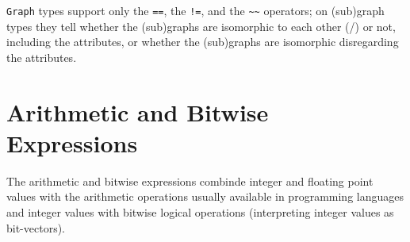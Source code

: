 \texttt{Graph} types support only the \texttt{==}, the \texttt{!=}, and the \texttt{\textasciitilde\textasciitilde} operators;
on (sub)graph types they tell whether the (sub)graphs are isomorphic to each other (/) or not, including the attributes, or whether the (sub)graphs are isomorphic disregarding the attributes.

\section{Arithmetic and Bitwise Expressions}

The arithmetic and bitwise expressions combinde integer and floating point values with the arithmetic operations usually available in programming languages
and integer values with bitwise logical operations (interpreting integer values as bit-vectors).

